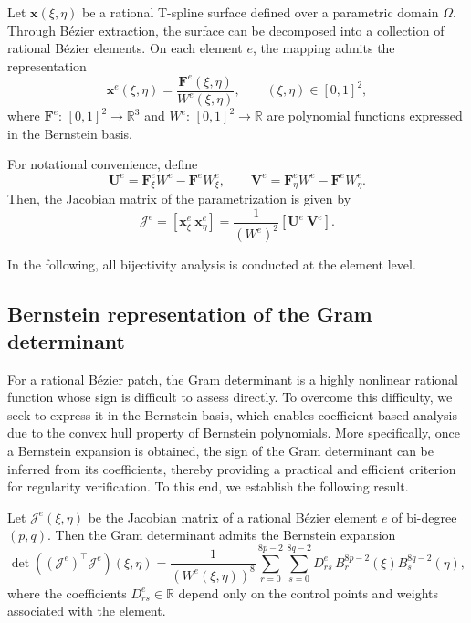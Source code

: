 \documentclass{jssc}
\begin{document}
Let $\bm{x}(\xi,\eta)$ be a rational T-spline surface defined over a parametric domain $\Omega$. Through B\'ezier extraction, the surface can be decomposed into a collection of rational B\'ezier elements. On each element $e$, the mapping admits the representation
\begin{equation}
\bm{x}^e(\xi,\eta)
=
\frac{\mathbf{F}^e(\xi,\eta)}{W^e(\xi,\eta)},
\qquad
(\xi,\eta)\in[0,1]^2,
\end{equation}
where $\mathbf{F}^e:\,[0,1]^2\to\mathbb{R}^3$ and $W^e:\,[0,1]^2\to\mathbb{R}$ are polynomial functions expressed in the Bernstein basis.

For notational convenience, define
\begin{equation}
\mathbf{U}^e = \mathbf{F}^e_\xi W^e - \mathbf{F}^e W^e_\xi,
\qquad
\mathbf{V}^e = \mathbf{F}^e_\eta W^e - \mathbf{F}^e W^e_\eta.
\end{equation}
Then, the Jacobian matrix of the parametrization is given by
\begin{equation}
\bm{\mathcal{J}}^e
=
[\bm{x}^e_\xi \ \bm{x}^e_\eta]
=
\frac{1}{(W^e)^2}
[\mathbf{U}^e \ \mathbf{V}^e].
\end{equation}

In the following, all bijectivity analysis is conducted at the element level.

\subsection{Bernstein representation of the Gram determinant}

For a rational B\'ezier patch, the Gram determinant is a highly nonlinear rational function whose sign is difficult to assess directly. To overcome this difficulty, we seek to express it in the Bernstein basis, which enables coefficient-based analysis due to the convex hull property of Bernstein polynomials. More specifically, once a Bernstein expansion is obtained, the sign of the Gram determinant can be inferred from its coefficients, thereby providing a practical and efficient criterion for regularity verification. To this end, we establish the following result.

\begin{theorem}
\label{thm:gram-bernstein}
Let $\bm{\mathcal{J}}^e(\xi,\eta)$ be the Jacobian matrix of a rational B\'ezier element $e$ of bi-degree $(p,q)$. Then the Gram determinant admits the Bernstein expansion
\begin{equation}
\det\!\left((\bm{\mathcal{J}}^e)^\top \bm{\mathcal{J}}^e \right)(\xi,\eta)
=
\frac{1}{(W^e(\xi,\eta))^{8}}
\sum_{r=0}^{8p-2}\sum_{s=0}^{8q-2}
D_{rs}^e \, B_r^{8p-2}(\xi) B_s^{8q-2}(\eta),
\label{eq:JeTJe-final}
\end{equation}
where the coefficients $D_{rs}^e\in\mathbb{R}$ depend only on the control points and weights associated with the element.
\end{theorem}
\end{document}
